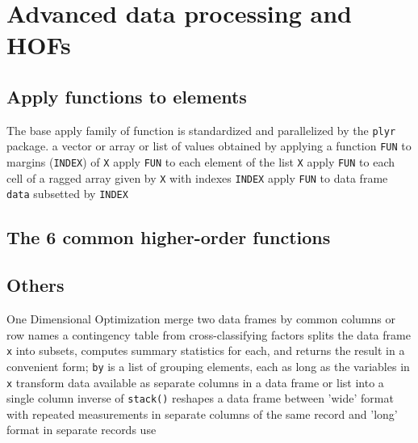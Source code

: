 \section{Advanced data processing and HOFs}{}
\subsection{Apply functions to elements}{The base apply family of function is
    standardized and parallelized by the {\tt plyr} package.}
	{a vector or array or list of values obtained by applying a function {\tt FUN} to margins ({\tt INDEX}) of {\tt X}}
	{apply {\tt FUN} to each element of the list {\tt X}}
	{apply {\tt FUN} to each cell of a ragged array given by {\tt X} with indexes {\tt INDEX}}
	{apply {\tt FUN} to data frame {\tt data} subsetted by {\tt INDEX}}

\subsection{The 6 common higher-order functions}{}

\subsection{Others}{}
	{One Dimensional Optimization}
	{merge two data frames by com\-mon col\-umns or row names}
	{a contingency table from cross-classi\-fy\-ing factors}
	{splits the data frame {\tt x} into subsets, computes summary statistics for each, and returns the result in a convenient form; {\tt by} is a list of grouping elements, each as long as the variables in {\tt x}}
	{transform data available as se\-pa\-rate col\-umns in a data frame or list into a single column}
	{inverse of {\tt stack()}}
	{reshapes a data frame between 'wide' format
    with re\-pea\-ted mea\-sure\-ments in separate
    columns of the same record and 'long' format in separate records}
	{use}

